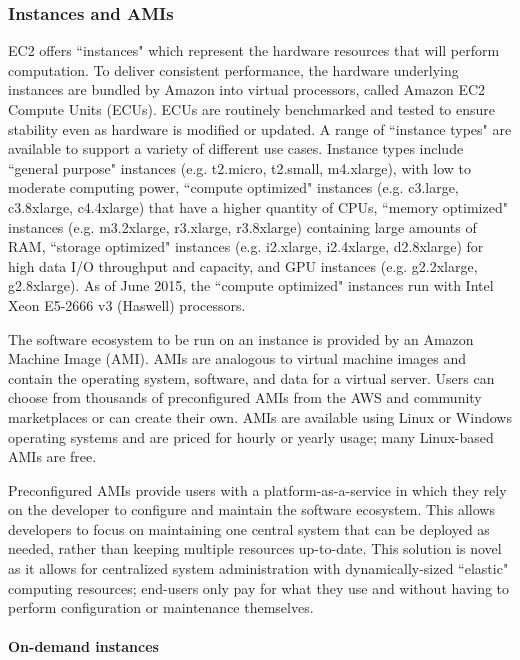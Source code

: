 \documentclass{frontiersSCNS} %
\begin{document}
\subsubsection{Instances and AMIs}

EC2 offers ``instances" which represent the hardware resources that will perform computation.  To deliver consistent performance, the hardware underlying instances are bundled by Amazon into virtual processors, called Amazon EC2 Compute Units (ECUs). ECUs are routinely benchmarked and tested to ensure stability even as hardware is modified or updated. A range of ``instance types" are available to support a variety of different use cases. Instance types include ``general purpose" instances (e.g. t2.micro, t2.small, m4.xlarge), with low to moderate computing power, ``compute optimized" instances (e.g. c3.large, c3.8xlarge, c4.4xlarge) that have a higher quantity of CPUs, ``memory optimized" instances (e.g. m3.2xlarge, r3.xlarge, r3.8xlarge) containing large amounts of RAM, ``storage optimized" instances (e.g. i2.xlarge, i2.4xlarge, d2.8xlarge) for high data I/O throughput and capacity, and GPU instances (e.g. g2.2xlarge, g2.8xlarge). As of June 2015, the ``compute optimized" instances run with Intel Xeon E5-2666 v3 (Haswell) processors.


The software ecosystem to be run on an instance is provided by an Amazon Machine Image (AMI). AMIs are analogous to virtual machine images and contain the operating system, software, and data for a virtual server. Users can choose from thousands of preconfigured AMIs from the AWS and community marketplaces or can create their own. AMIs are available using Linux or Windows operating systems and are priced for hourly or yearly usage; many Linux-based AMIs are free.


Preconfigured AMIs provide users with a platform-as-a-service in which they rely on the developer to configure and maintain the software ecosystem. This allows developers to focus on maintaining one central system that can be deployed as needed, rather than keeping multiple resources up-to-date. This solution is novel as it allows for centralized system administration with dynamically-sized ``elastic" computing resources; end-users only pay for what they use and without having to perform configuration or maintenance themselves.

\paragraph{On-demand instances}
\end{document}

